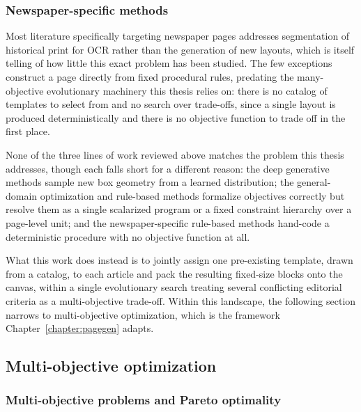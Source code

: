 \subsubsection{Newspaper-specific methods}

Most literature specifically targeting newspaper pages addresses segmentation of historical print for OCR rather than the generation of new layouts, which is itself telling of how little this exact problem has been studied. The few exceptions~\cite{Strecker2009AutomaticLOF, Oliveira2009TwoAFE} construct a page directly from fixed procedural rules, predating the many-objective evolutionary machinery this thesis relies on: there is no catalog of templates to select from and no search over trade-offs, since a single layout is produced deterministically and there is no objective function to trade off in the first place.

None of the three lines of work reviewed above matches the problem this thesis addresses, though each falls short for a different reason: the deep generative methods sample new box geometry from a learned distribution; the general-domain optimization and rule-based methods formalize objectives correctly but resolve them as a single scalarized program or a fixed constraint hierarchy over a page-level unit; and the newspaper-specific rule-based methods hand-code a deterministic procedure with no objective function at all. 

What this work does instead is to jointly assign one pre-existing template, drawn from a catalog, to each article and pack the resulting fixed-size blocks onto the canvas, within a single evolutionary search treating several conflicting editorial criteria as a multi-objective trade-off. Within this landscape, the following section narrows to multi-objective optimization, which is the framework Chapter~\ref{chapter:pagegen} adapts.

\subsection{Multi-objective optimization}
\label{sec:sota-moo}

\subsubsection{Multi-objective problems and Pareto optimality}
\label{sec:sota-pareto}

